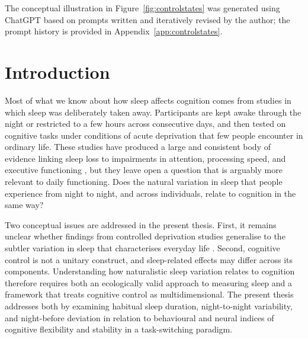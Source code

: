 \documentclass[12pt,a4paper]{report}
\begin{document}
The conceptual illustration in Figure~\ref{fig:controlstates} was generated using ChatGPT based on prompts written and iteratively revised by the author; the prompt history is provided in Appendix~\ref{app:controlstates}.




\newpage
\tableofcontents



\clearpage
{}
\setcounter{page}{1}

\chapter{Introduction}

Most of what we know about how sleep affects cognition comes from studies in which sleep was deliberately taken away. Participants are kept awake through the night or restricted to a few hours across consecutive days, and then tested on cognitive tasks under conditions of acute deprivation that few people encounter in ordinary life. These studies have produced a large and consistent body of evidence linking sleep loss to impairments in attention, processing speed, and executive functioning \parencite{basner2013sleepcognition, killgore2010sleepcognition, lim2010meta, lowe2017meta}, but they leave open a question that is arguably more relevant to daily functioning. Does the natural variation in sleep that people experience from night to night, and across individuals, relate to cognition in the same way?

Two conceptual issues are addressed in the present thesis. First, it remains unclear whether findings from controlled deprivation studies generalise to the subtler variation in sleep that characterises everyday life \parencite{fjell2024sleep, sen2023sleepef}. Second, cognitive control is not a unitary construct, and sleep-related effects may differ across its components. Understanding how naturalistic sleep variation relates to cognition therefore requires both an ecologically valid approach to measuring sleep and a framework that treats cognitive control as multidimensional. The present thesis addresses both by examining habitual sleep duration, night-to-night variability, and night-before deviation in relation to behavioural and neural indices of cognitive flexibility and stability in a task-switching paradigm.
\end{document}
